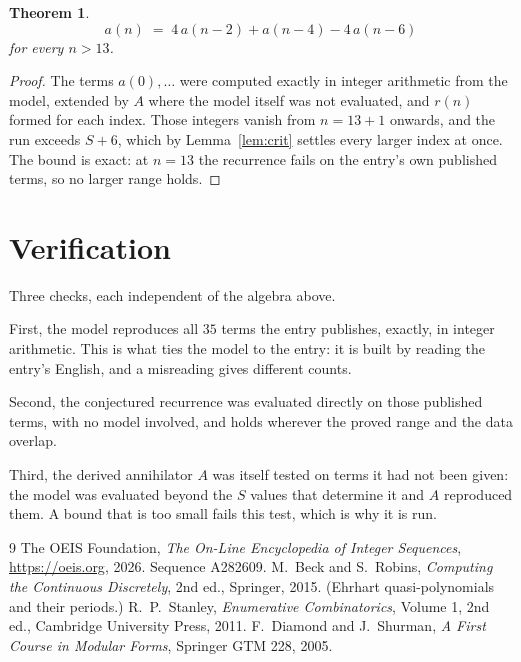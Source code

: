 \documentclass[11pt,a4paper]{article}
\theoremstyle{plain}
\newtheorem{theorem}{Theorem}
\theoremstyle{definition}
\begin{document}
\begin{theorem}
\[
a(n)\;=\;4\,a(n-2) + a(n-4) - 4\,a(n-6)
\]
for every $n>13$.
\end{theorem}

\begin{proof}
The terms $a(0),\dots$ were computed exactly in integer arithmetic from the model, extended by
$A$ where the model itself was not evaluated, and $r(n)$ formed for each index. Those integers
vanish from $n=13+1$ onwards, and the run exceeds $S+6$, which by
Lemma~\ref{lem:crit} settles every larger index at once. The bound is exact: at $n=13$ the recurrence fails on the entry's own published terms, so no larger range holds.
\end{proof}

\section{Verification}

Three checks, each independent of the algebra above.

First, the model reproduces all $35$ terms the entry publishes, exactly, in integer
arithmetic. This is what ties the model to the entry: it is built by reading the entry's
English, and a misreading gives different counts.

Second, the conjectured recurrence was evaluated directly on those published terms, with no
model involved, and holds wherever the proved range and the data overlap.

Third, the derived annihilator $A$ was itself tested on terms it had not been given: the model
was evaluated beyond the $S$ values that determine it and $A$ reproduced them. A bound that is
too small fails this test, which is why it is run.

\begin{thebibliography}{9}
 The OEIS Foundation, \emph{The On-Line Encyclopedia of Integer
Sequences}, \url{https://oeis.org}, 2026. Sequence A282609.
 M.~Beck and S.~Robins, \emph{Computing the Continuous Discretely},
2nd ed., Springer, 2015. (Ehrhart quasi-polynomials and their periods.)
 R.~P.~Stanley, \emph{Enumerative Combinatorics}, Volume 1, 2nd ed.,
Cambridge University Press, 2011.
 F.~Diamond and J.~Shurman, \emph{A First Course in Modular Forms},
Springer GTM 228, 2005.
\end{thebibliography}
\end{document}
